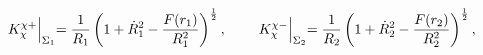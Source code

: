 \begin{equation}
\label{ic1} K^{\chi+}_{\chi}\Bigl|_{\Sigma_{1}}=
\frac{1}{R_{1}}\left(1+\dot{R}_{1}^2-\frac{
F(r_{1})}{R_{1}^2}\right)^{\frac12} , \hspace{0.8cm}
K^{\chi-}_{\chi}\Bigl|_{\Sigma_{2}}=\frac{1}{R_{2}}
  \left(1+\dot{R}_{2}^2-\frac{F(r_{2})}{R_{2}^2}\right)^{\frac{1}{2}},
\end{equation}

